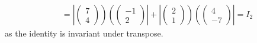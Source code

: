 \documentclass[aps,preprint]{revtex4}
\begin{document}
\begin{enumerate}
\begin{align}
& =\left\vert \left( 
\begin{array}{c}
7 \\ 
4%
\end{array}%
\right) \right) \left( \left( 
\begin{array}{c}
-1 \\ 
2%
\end{array}%
\right) \right\vert +\left\vert \left( 
\begin{array}{c}
2 \\ 
1%
\end{array}%
\right) \right) \left( \left( 
\begin{array}{c}
4 \\ 
-7%
\end{array}%
\right) \right\vert =I_{2}
\end{align}%
as the identity is invariant under transpose.
\end{enumerate}
\end{document}
